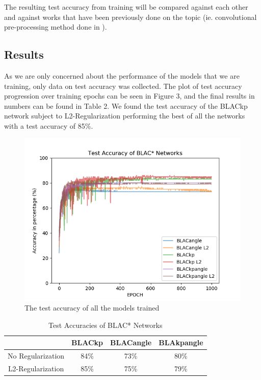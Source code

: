 \documentclass{article}
\begin{document}
The resulting test accuracy from training will be compared against each other and against works that have been previously done on the topic (ie. convolutional pre-processing method done in \citep{stienen2012computational} \citep{schindler2008recognizing}).

\subsection{Results}

As we are only concerned about the performance of the models that we are training, only data on test accuracy was collected. The plot of test accuracy progression over training epochs can be seen in Figure 3, and the final results in numbers can be found in Table 2. We found the test accuracy of the BLACkp network subject to L2-Regularization performing the best of all the networks with a test accuracy of 85\%. 

\begin{figure}[h]
\centering
\includegraphics[scale=0.76]{te_acc}
\caption{The test accuracy of all the models trained}
\end{figure}

\begin{table}[h]
	\caption{Test Accuracies of BLAC* Networks}
	\centering
	\begin{tabular}{c|ccc}
	\toprule
	& BLACkp & BLACangle & BLAkpangle \\
	\midrule	
	No Regularization & 84\% & 73\% & 80\%\\
	\midrule
	L2-Regularization & 85\% & 75\% & 79\%\\
	\end{tabular}
\end{table}
\end{document}
